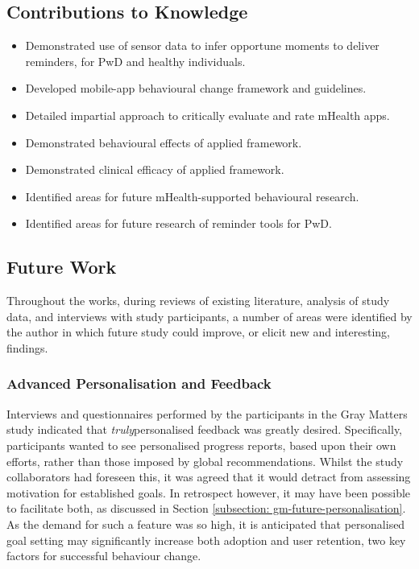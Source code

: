 \subsection{Contributions to Knowledge}
\begin{itemize}
	\item Demonstrated use of sensor data to infer opportune moments to deliver reminders, for PwD and healthy individuals.
	\item Developed mobile-app behavioural change framework and guidelines.
	\item Detailed impartial approach to critically evaluate and rate mHealth apps.
	\item Demonstrated behavioural effects of applied framework.
	\item Demonstrated clinical efficacy of applied framework.
	\item Identified areas for future mHealth-supported behavioural research.
	\item Identified areas for future research of reminder tools for PwD.
\end{itemize}

\subsection{Future Work}
Throughout the works, during reviews of existing literature, analysis of study data, and interviews with study participants, a number of areas were identified by the author in which future study could improve, or elicit new and interesting, findings.

\subsubsection{Advanced Personalisation and Feedback}
Interviews and questionnaires performed by the participants in the Gray Matters study indicated that \textit{truly}personalised feedback was greatly desired. Specifically, participants wanted to see personalised progress reports, based upon their own efforts, rather than those imposed by global recommendations. Whilst the study collaborators had foreseen this, it was agreed that it would detract from assessing motivation for established goals. In retrospect however, it may have been possible to facilitate both, as discussed in Section \ref{subsection: gm-future-personalisation}. As the demand for such a feature was so high, it is anticipated that personalised goal setting may significantly increase both adoption and user retention, two key factors for successful behaviour change.

